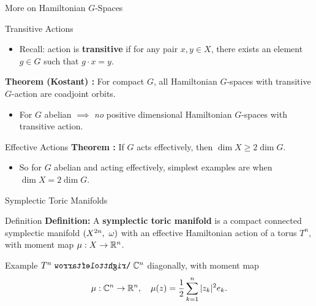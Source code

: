 \begin{frame}{More on Hamiltonian $G$-Spaces}
    \begin{block}{Transitive Actions}
        \begin{itemize}
            \item Recall: action is \textbf{transitive} if for any pair $x, y \in X$, there exists an element $g \in G$ such that $g \cdot x = y$.
        \end{itemize}
        \textbf{Theorem (Kostant) \cite{guillemin1994}:} For compact $G$, all Hamiltonian $G$-spaces with transitive $G$-action are coadjoint orbits.
        \begin{itemize}
            \item For $G$ abelian $\implies$ \emph{no} positive dimensional Hamiltonian $G$-spaces with transitive action.
        \end{itemize}
    \end{block}
    \begin{block}{Effective Actions}
        \textbf{Theorem \cite{guillemin1994}:} If $G$ acts effectively, then $\dim X \geq 2 \dim G$.
        \begin{itemize}
            \item So for $G$ abelian and acting effectively, simplest examples are when $\dim X = 2 \dim G$.
        \end{itemize}
    \end{block}    
\end{frame}

\begin{frame}{Symplectic Toric Manifolds}
    \begin{block}{Definition}
        \textbf{Definition:} A \textbf{symplectic toric manifold} is a compact connected symplectic manifold $(X^{2n},\ \omega)$ with an effective Hamiltonian action of a torus $T^{n}$, with moment map $\mu : X \rightarrow \mathbb{R}^{n}$.
    \end{block}

    \begin{block}{Example}
        $T^{n} \acts \CC^{n}$ diagonally, with moment map
        $$ \mu : \mathbb{C}^{n} \rightarrow \mathbb{R}^{n},\quad \mu(z) = \frac{1}{2} \sum_{k=1}^{n} |z_{k}|^{2}e_{k}. $$
    \end{block}
\end{frame}

